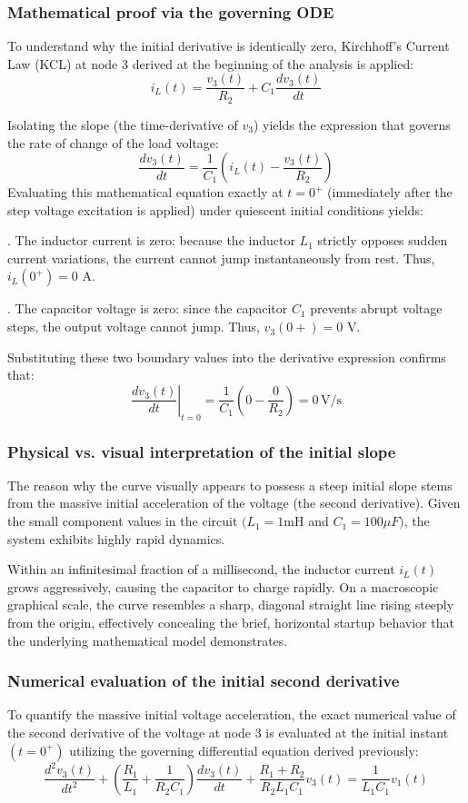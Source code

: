 \documentclass[11pt, a4paper]{article}
\begin{document}
\subsubsection*{Mathematical proof via the governing ODE}

To understand why the initial derivative is identically zero, Kirchhoff's Current Law (KCL) at node 3 derived at the beginning of the analysis is applied:
\[
i_L(t) = \frac{v_3(t)}{R_2} + C_1 \frac{dv_3(t)}{dt}
\]

Isolating the slope (the time-derivative of $v_3$) yields the expression that governs the rate of change of the load voltage:
\[
\frac{dv_3(t)}{dt} = \frac{1}{C_1 } \left(i_L(t) - \frac{v_3(t)}{R_2}\right)
\]
Evaluating this mathematical equation exactly at $t = 0^+$ (immediately after the step voltage excitation is applied) under quiescent initial conditions yields:

\medskip{}. The inductor current is zero: because the inductor $L_1$ strictly opposes sudden current variations, the current cannot jump instantaneously from rest. Thus, $i_L(0^+) = 0$ A.

\medskip{}. The capacitor voltage is zero: since the capacitor $C_1$ prevents abrupt voltage steps, the output voltage cannot jump. Thus, $v_3 (0+ ) = 0$ V.

Substituting these two boundary values into the derivative expression confirms that:
\[
\left.\frac{dv_3 (t)}{dt}\right|_{t=0}
 = \frac{1}{C_1}\left(0 - \frac{0}{R_2}\right) = 0\, \mathrm{V\!/s}
\]


\subsubsection*{Physical vs. visual interpretation of the initial slope}
The reason why the curve visually appears to possess a steep initial slope stems from the massive initial acceleration of the voltage (the second derivative). Given the small component values in the circuit $(L_1 = 1$mH and $C_1 = 100 \mu F)$, the system exhibits highly rapid dynamics.

Within an infinitesimal fraction of a millisecond, the inductor current $i_L(t)$ grows aggressively, causing the capacitor to charge rapidly. On a macroscopic graphical scale, the curve resembles a sharp, diagonal straight line rising steeply from the origin, effectively concealing the brief, horizontal startup behavior that the underlying mathematical model demonstrates.


\subsubsection*{Numerical evaluation of the initial second derivative}
To quantify the massive initial voltage acceleration, the exact numerical value of the second derivative of the voltage at node 3 is evaluated at the initial instant $(t = 0^+)$ utilizing the governing differential equation derived previously:
\[
\frac{d^2v_3(t)}{dt^2} + \left(\frac{R_1}{L_1} +\frac{1}{R_2C_1}\right)\frac{dv_3(t)}{dt} + \frac{R_1+R_2}{R_2L_1C_1}v_3(t) =  \frac{1}{L_1C_1}v_1(t)
\]
\end{document}
